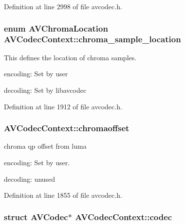 Definition at line 2998 of file avcodec.\+h.

\subsubsection[{\texorpdfstring{chroma\+\_\+sample\+\_\+location}{chroma_sample_location}}]{\setlength{\rightskip}{0pt plus 5cm}enum {\bf A\+V\+Chroma\+Location} A\+V\+Codec\+Context\+::chroma\+\_\+sample\+\_\+location}\hypertarget{struct_a_v_codec_context_ac60a0209642b5d74068cab0ac35a78b2}{}\label{struct_a_v_codec_context_ac60a0209642b5d74068cab0ac35a78b2}
This defines the location of chroma samples.
\begin{DoxyItemize}
\item encoding\+: Set by user
\item decoding\+: Set by libavcodec 
\end{DoxyItemize}

Definition at line 1912 of file avcodec.\+h.

\subsubsection[{\texorpdfstring{chromaoffset}{chromaoffset}}]{ A\+V\+Codec\+Context\+::chromaoffset}\hypertarget{struct_a_v_codec_context_ad0648de462329a899457c04f539e3782}{}\label{struct_a_v_codec_context_ad0648de462329a899457c04f539e3782}
chroma qp offset from luma
\begin{DoxyItemize}
\item encoding\+: Set by user.
\item decoding\+: unused 
\end{DoxyItemize}

Definition at line 1855 of file avcodec.\+h.

\subsubsection[{\texorpdfstring{codec}{codec}}]{ struct {\bf A\+V\+Codec}$\ast$ A\+V\+Codec\+Context\+::codec}\hypertarget{struct_a_v_codec_context_a6e606effa68724cae2ef5cc05f7fd9cb}{}\label{struct_a_v_codec_context_a6e606effa68724cae2ef5cc05f7fd9cb}


